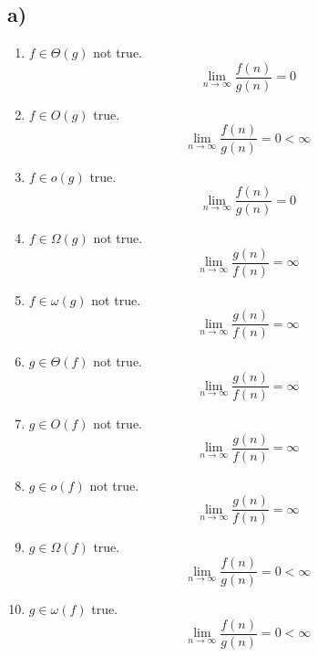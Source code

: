 \documentclass{article}
\begin{document}
\subsection*{a)}
\begin{enumerate}
    \item $f \in \Theta(g)$ not true.
        $$ \lim_{n \to \infty} \frac{f(n)}{g(n)} = 0$$
    \item $f \in O(g)$ true.
        $$ \lim_{n \to \infty} \frac{f(n)}{g(n)} = 0 < \infty$$
    \item $f \in o(g)$ true.
        $$ \lim_{n \to \infty} \frac{f(n)}{g(n)} = 0$$
    \item $f \in \Omega(g)$ not true.
        $$ \lim_{n \to \infty} \frac{g(n)}{f(n)} = \infty$$
    \item $f \in \omega(g)$ not true.
        $$ \lim_{n \to \infty} \frac{g(n)}{f(n)} = \infty$$
    \item $g \in \Theta(f)$ not true.
        $$ \lim_{n \to \infty} \frac{g(n)}{f(n)} = \infty$$
    \item $g \in O(f)$ not true.
        $$ \lim_{n \to \infty} \frac{g(n)}{f(n)} = \infty$$
    \item $g \in o(f)$ not true.
        $$ \lim_{n \to \infty} \frac{g(n)}{f(n)} = \infty$$
    \item $g \in \Omega(f)$ true.
        $$ \lim_{n \to \infty} \frac{f(n)}{g(n)} = 0 < \infty$$
    \item $g \in \omega(f)$ true.
        $$ \lim_{n \to \infty} \frac{f(n)}{g(n)} = 0 < \infty$$
\end{enumerate}
\end{document}
